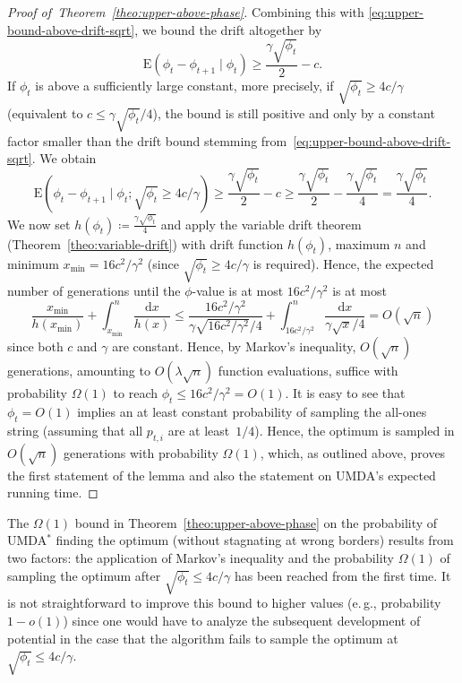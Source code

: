 \documentclass[11pt, a4paper]{article}
\newcommand{\xmin}{x_{\min}}
\newcommand{\umdastar}{UMDA$^*$\xspace}
\newcommand{\umda}{UMDA\xspace}
\newcommand*{\E}{\mathrm{E}}
\newcommand{\eg}{e.\,g.\xspace}
\newenvironment{proofof}[1]{\begin{proof}[Proof of~#1]}{\end{proof}}
\begin{document}
\begin{proofof}{Theorem~\ref{theo:upper-above-phase}}
Combining this with \eqref{eq:upper-bound-above-drift-sqrt}, 
we bound the drift altogether by  
\[ \E(\phi_t-\phi_{t+1}\mid \phi_t) \ge \frac{\gamma\sqrt{\phi_t}}{2}-c.
\]
If $\phi_t$ is above a sufficiently large constant, more precisely, if $ \sqrt{\phi_t}\ge 4c/\gamma$ (equivalent to 
$c\le \gamma\sqrt{\phi_t}/4$), 
the bound is still positive and only by a constant factor smaller than the drift bound stemming 
from~\eqref{eq:upper-bound-above-drift-sqrt}. We obtain 
\[ \E(\phi_t-\phi_{t+1}\mid \phi_t; \sqrt{\phi_t}\ge 4c/\gamma) \ge \frac{\gamma\sqrt{\phi_t}}{2}-c \ge 
\frac{\gamma\sqrt{\phi_t}}{2} - \frac{\gamma\sqrt{\phi_t}}{4} = \frac{\gamma\sqrt{\phi_t}}{4}.
\]
We now set $h(\phi_t)\coloneqq \frac{\gamma\sqrt{\phi_t}}{4}$ and  
apply 
 the variable drift theorem (Theorem~\ref{theo:variable-drift}) with drift function $h(\phi_t)$, maximum $n$ 
and minimum $\xmin=16c^2/\gamma^2$ (since $\sqrt{\phi_t}\ge 4c/\gamma$ is required).
 Hence, the expected number of generations until 
the $\phi$-value is at most $16c^2/\gamma^2$ is at most
\[
\frac{\xmin}{h(\xmin)} + \int_{\xmin}^n \frac{\mathrm{d}x}{h(x)} \le \frac{16c^2/\gamma^2}{\gamma\sqrt{16c^2/\gamma^2}/4} + 
\int_{16c^2/\gamma^2}^n \frac{\mathrm{d}x}{\gamma\sqrt{x}/4} = O(\sqrt{n})
\]
since both $c$ and $\gamma$ are constant. Hence, by Markov's inequality, $O(\sqrt{n})$ generations, 
amounting to $O(\lambda\sqrt{n})$ function evaluations, suffice with probability $\Omega(1)$ to reach 
$\phi_t\le 16c^2/\gamma^2=O(1)$. 
It is easy to see that $\phi_t=O(1)$ implies 
an at least constant probability of sampling the all-ones string (assuming that all $p_{t,i}$ are at least~$1/4$). 
Hence, the optimum 
is sampled in $O(\sqrt{n})$ generations  with probability $\Omega(1)$, which, as outlined above, 
 proves the first statement 
of the lemma and also the statement on \umda's  expected running time.
\end{proofof}

The $\Omega(1)$ bound in Theorem~\ref{theo:upper-above-phase} on 
the probability of \umdastar finding the optimum (without stagnating at wrong borders) 
results from two factors: the application of Markov's inequality and the 
probability $\Omega(1)$ of sampling the optimum after $\sqrt{\phi_t}\le 4c/\gamma$ has been reached from the first time. 
It is not straightforward to improve this bound to higher values (\eg, probability $1-o(1)$) since
one would have to analyze the subsequent development of potential in the case that the algorithm fails 
to sample the optimum at $\sqrt{\phi_t}\le 4c/\gamma$. 
\end{document}
